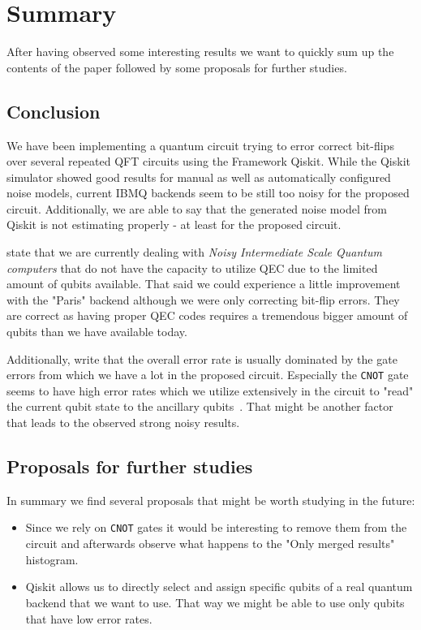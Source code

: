 \section{Summary}
\label{sec:summary}

After having observed some interesting results we want to quickly sum up the contents of the paper followed by some proposals for further studies.

\subsection{Conclusion}
\label{subsec:conclusion}

We have been implementing a quantum circuit trying to error correct bit-flips over several repeated QFT circuits using the Framework Qiskit.
While the Qiskit simulator showed good results for manual as well as automatically configured noise models, current IBMQ backends seem to be still too noisy for the proposed circuit.
Additionally, we are able to say that the generated noise model from Qiskit is not estimating properly - at least for the proposed circuit.

 state that we are currently dealing with \emph{Noisy Intermediate Scale Quantum computers} that do not have the capacity to utilize QEC due to the limited amount of qubits available.
That said we could experience a little improvement with the "Paris" backend although we were only correcting bit-flip errors.
They are correct as having proper QEC codes requires a tremendous bigger amount of qubits than we have available today.

Additionally,  write that the overall error rate is usually dominated by the gate errors from which we have a lot in the proposed circuit.
Especially the \texttt{CNOT} gate seems to have high error rates which we utilize extensively in the circuit to "read" the current qubit state to the ancillary qubits~\cite[p. 3]{tannu2018case}.
That might be another factor that leads to the observed strong noisy results.

\subsection{Proposals for further studies}
\label{subsec:proposals-for-further-studies}

In summary we find several proposals that might be worth studying in the future:

\begin{itemize}
    \item Since we rely on \texttt{CNOT} gates it would be interesting to remove them from the circuit and afterwards observe what happens to the "Only merged results" histogram.
    \item Qiskit allows us to directly select and assign specific qubits of a real quantum backend that we want to use.
    That way we might be able to use only qubits that have low error rates.
\end{itemize}
